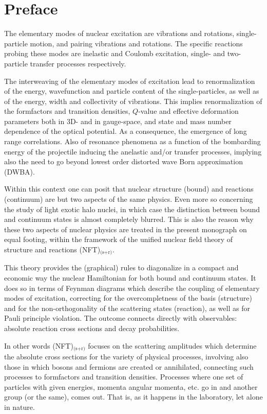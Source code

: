  \chapter*{Preface}
The elementary modes of nuclear excitation are vibrations and rotations, single-particle  motion, and pairing vibrations and rotations. The specific reactions probing these modes are inelastic and Coulomb excitation,  single- and two- particle transfer processes respectively. 

The interweaving of the elementary modes of excitation lead to renormalization of the energy, wavefunction and particle content of the single-particles, as well as of the energy, width and collectivity of vibrations. This implies renormalization of the formfactors and transition densities, $Q$-value and effective deformation parameters both in 3D- and in gauge-space, and state and mass number dependence of the optical potential. As a consequence, the emergence of long range correlations. Also of resonance phenomena as a function of the bombarding energy of the projectile inducing the anelastic and/or transfer processes, implying also the need to go beyond lowest order distorted wave Born approximation (DWBA).

Within this context one can posit that nuclear structure (bound) and reactions (continuum) are but two aspects of the same physics.  Even more so concerning the study of light exotic halo nuclei, in which case the distinction between bound and continuum states is almost completely blurred. This is also the reason why these two aspects of nuclear physics are treated in the present monograph on equal footing,  within the framework of the unified nuclear field theory of structure and reactions (NFT)$_\text{(s+r)}$. 


This theory provides the (graphical) rules to diagonalize in a compact and economic way the nuclear Hamiltonian for both bound and continuum states. It does so in terms of Feynman diagrams which describe the coupling of elementary modes of excitation, correcting for the overcompletness of the basis  (structure) and for the  non-orthogonality of the scattering states (reaction), as well as for Pauli principle violation. The outcome connects directly with observables: absolute reaction cross sections and decay probabilities. 


In other words (NFT)$_\text{(s+r)}$ focuses on the scattering amplitudes which determine the absolute cross sections for the variety of physical processes, involving also those in which bosons and fermions are created or annihilated, connecting such processes to formfactors and transition densities. Processes where one set of particles with given energies, momenta angular momenta, etc. go in and another group (or the same), comes out. That is, as it happens in the laboratory, let alone in nature.

